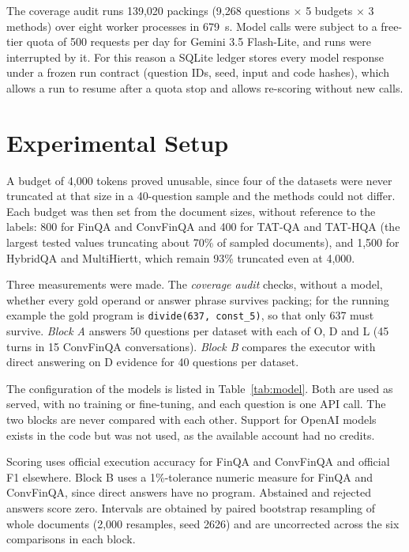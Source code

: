 \documentclass[11pt]{article}
\begin{document}
The coverage audit runs 139,020 packings (9,268 questions $\times$ 5 budgets $\times$ 3
methods) over eight worker processes in 679~s. Model calls were subject to a free-tier
quota of 500 requests per day for Gemini 3.5 Flash-Lite, and runs were interrupted by it.
For this reason a SQLite ledger stores every model response under a
frozen run contract (question IDs, seed, input and code hashes), which allows a run to
resume after a quota stop and allows re-scoring without new calls.

\begin{table}[t]
\centering\footnotesize\setlength{\tabcolsep}{3pt}
\resizebox{\columnwidth}{!}{}
\caption{Wall time (s): single-process Python and Spark on 1--8 cores. Size is records
per source dataset. All runs equal the Python reference.}
\label{tab:spark}
\end{table}

\section{Experimental Setup}
\label{sec:setup}
A budget of 4,000 tokens proved unusable,
since four of the datasets were never truncated at that size in a 40-question sample and
the methods could not differ. Each budget was then set from the document sizes, without
reference to the labels: 800 for FinQA and ConvFinQA and 400 for TAT-QA and TAT-HQA (the
largest tested values truncating about 70\% of sampled documents), and 1,500 for HybridQA
and MultiHiertt, which remain 93\% truncated even at 4,000.

Three measurements were made. The \emph{coverage audit} checks, without a model, whether
every gold operand or answer phrase survives packing; for the running example the gold
program is \texttt{divide(637, const\_5)}, so that only 637 must survive. \emph{Block A}
answers 50 questions per dataset with each of O, D and L (45 turns in 15 ConvFinQA
conversations). \emph{Block B} compares the executor with direct answering on D evidence
for 40 questions per dataset.

The configuration of the models is listed in Table~\ref{tab:model}. Both are used as
served, with no training or fine-tuning, and each question is one API call. The two
blocks are never compared with each other. Support for OpenAI models exists in the code
but was not used, as the available account had no credits.

Scoring uses official execution accuracy for FinQA and ConvFinQA and official F1
elsewhere. Block B uses a 1\%-tolerance numeric measure for FinQA and ConvFinQA, since
direct answers have no program. Abstained and rejected answers score zero. Intervals are
obtained by paired bootstrap resampling of whole documents (2,000 resamples, seed 2626)
and are uncorrected across the six comparisons in each block.
\end{document}
